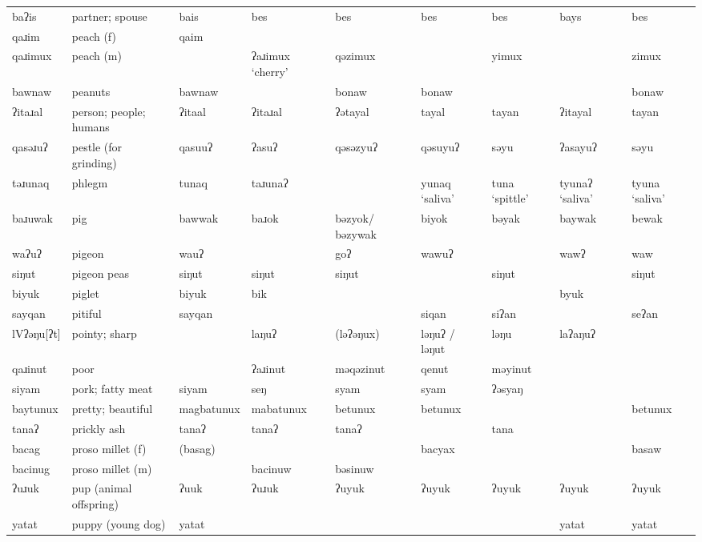 \begin{landscape}
\begin{longtable}{*{9}{>{\raggedright\arraybackslash}p{}}}
\text{*}baʔis        & partner; spouse & bais & bes & bes & bes & bes & bays & bes\\
\text{*}qaɹim        & peach (f) & qaim &  &  &  &  &  & \\
\text{*}qaɹimux      & peach (m) &  & ʔaɹimux `cherry' & qəzimux &  & yimux &  & zimux\\
\text{*}bawnaw       & peanuts & bawnaw &  & bonaw & bonaw &  &  & bonaw\\
\text{*}ʔitaɹal      & person; people; humans & ʔitaal & ʔitaɹal & ʔətayal & tayal & tayan & ʔitayal & tayan\\
\text{*}qasəɹuʔ      & pestle (for grinding) & qasuuʔ & ʔasuʔ & qəsəzyuʔ & qəsuyuʔ & səyu & ʔasayuʔ & səyu\\
\text{*}təɹunaq      & phlegm & tunaq & taɹunaʔ &  & yunaq `saliva' & tuna `spittle' & tyunaʔ `saliva' & tyuna `saliva'\\
\text{*}baɹuwak      & pig & bawwak & baɹok & bəzyok/ \newline bəzywak & biyok & bəyak & baywak & bewak\\
\text{*}waʔuʔ        & pigeon & wauʔ &  & goʔ & wawuʔ &  & wawʔ & waw\\
\text{*}siŋut        & pigeon peas & siŋut & siŋut & siŋut &  & siŋut &  & siŋut\\
\text{*}biyuk        & piglet & biyuk & bik &  &  &  & byuk & \\
\text{*}sayqan       & pitiful & sayqan &  &  & siqan & siʔan &  & seʔan\\
\text{*}lVʔəŋu[ʔt]   & pointy; sharp &  & laŋuʔ & (ləʔəŋux) & ləŋuʔ / ləŋut & ləŋu & laʔaŋuʔ & \\
\text{*}qaɹinut      & poor &  & ʔaɹinut & məqəzinut & qenut & məyinut &  & \\
\text{*}siyam        & pork; fatty meat & siyam & seŋ & syam & syam & ʔəsyaŋ &  & \\
\text{*}baytunux    & pretty; beautiful & magbatunux & mabatunux & betunux & betunux &  &  & betunux\\
\text{*}tanaʔ        & prickly ash & tanaʔ & tanaʔ & tanaʔ &  & tana &  & \\
\text{*}bacag        & proso millet (f) & (basag) &  &  & bacyax &  &  & basaw\\
\text{*}bacinug      & proso millet (m) &  & bacinuw & bəsinuw &  &  &  & \\
\text{*}ʔuɹuk        & pup (animal offspring) & ʔuuk & ʔuɹuk & ʔuyuk & ʔuyuk & ʔuyuk & ʔuyuk & ʔuyuk\\
\text{*}yatat        & puppy (young dog) & yatat &  &  &  &  & yatat & yatat\\

\end{longtable}
\end{landscape}
